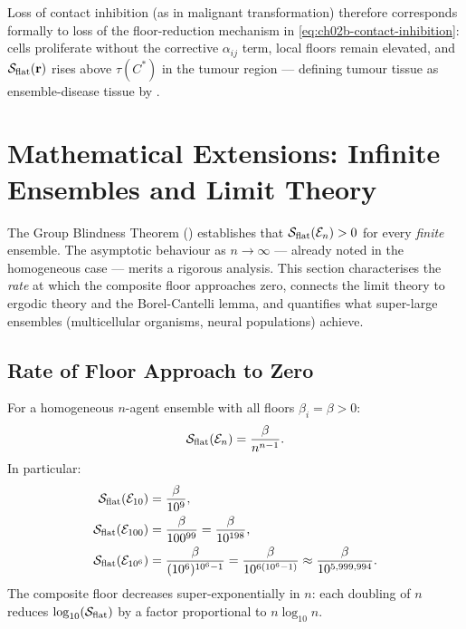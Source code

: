 Loss of contact inhibition (as in malignant transformation) therefore
corresponds formally to loss of the floor-reduction mechanism in
\eqref{eq:ch02b-contact-inhibition}: cells proliferate without the corrective
$\alpha_{ij}$ term, local floors remain elevated, and
$\mathcal{S}_{\mathrm{flat}}(\mathbf{r})$ rises above $\tau(C^*)$ in the tumour
region — defining tumour tissue as ensemble-disease tissue by
.

\section{Mathematical Extensions: Infinite Ensembles and Limit Theory}
\label{sec:ch02b-mathematical-extensions}

The Group Blindness Theorem () establishes that
$\mathcal{S}_{\mathrm{flat}}(\mathcal{E}_n) > 0$ for every \emph{finite} ensemble.
The asymptotic behaviour as $n \to \infty$ — already noted in the homogeneous
case — merits a rigorous analysis.  This section characterises the \emph{rate}
at which the composite floor approaches zero, connects the limit theory to
ergodic theory and the Borel-Cantelli lemma, and quantifies what super-large
ensembles (multicellular organisms, neural populations) achieve.

\subsection{Rate of Floor Approach to Zero}

\begin{theorem}
\label{thm:ch02b-asymptotic-rate}
For a homogeneous $n$-agent ensemble with all floors $\beta_i = \beta > 0$:
\begin{equation}
  \mathcal{S}_{\mathrm{flat}}(\mathcal{E}_n)
  = \frac{\beta}{n^{n-1}}.
  \label{eq:ch02b-hom-floor}
\end{equation}
In particular:
\begin{align}
  \mathcal{S}_{\mathrm{flat}}(\mathcal{E}_{10})   &= \frac{\beta}{10^9}, \label{eq:ch02b-n10} \\
  \mathcal{S}_{\mathrm{flat}}(\mathcal{E}_{100})  &= \frac{\beta}{100^{99}} = \frac{\beta}{10^{198}}, \label{eq:ch02b-n100} \\
  \mathcal{S}_{\mathrm{flat}}(\mathcal{E}_{10^6}) &= \frac{\beta}{(10^6)^{10^6-1}} = \frac{\beta}{10^{6(10^6-1)}} \approx \frac{\beta}{10^{5{,}999{,}994}}. \label{eq:ch02b-n1M}
\end{align}
The composite floor decreases super-exponentially in $n$: each doubling of
$n$ reduces $\log_{10}(\mathcal{S}_{\mathrm{flat}})$ by a factor proportional to $n
\log_{10} n$.
\end{theorem}


